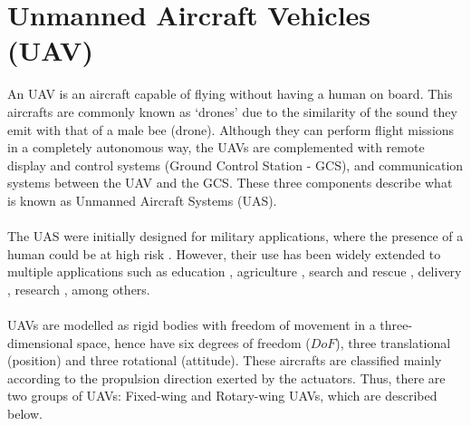 \section{Unmanned Aircraft Vehicles (UAV)}
An UAV is an aircraft capable of flying without having a human on board. This aircrafts are commonly known as `drones' due to the similarity of the sound they emit with that of a male bee (drone). Although they can perform flight missions in a completely autonomous way, the UAVs are complemented with remote display and control systems (Ground Control Station - GCS), and communication systems between the UAV and the GCS. These three components describe what is known as Unmanned Aircraft Systems (UAS).\\\\
The UAS were initially designed for military applications, where the presence of a human could be at high risk \cite{Bouabdallah2007}. However, their use has been widely extended to multiple applications such as education \cite{Rahman2017}, agriculture \cite{Garcia2015}, search and rescue \cite{KumarS2015}, delivery \cite{Gatteschi2015}, research \cite{Gonzalez2012}, among others. 
\\\\
UAVs are modelled as rigid bodies with freedom of movement in a three-dimensional space, hence have six degrees of freedom ($DoF$), three translational (position) and three rotational (attitude). These aircrafts are classified mainly according to the propulsion direction exerted by the actuators. Thus, there are two groups of UAVs: Fixed-wing and Rotary-wing UAVs, which are described below.

